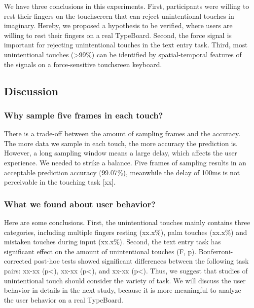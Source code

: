 We have three conclusions in this experiments. First, participants were willing to rest their fingers on the touchscreen that can reject unintentional touches in imaginary. Hereby, we proposed a hypothesis to be verified, where users are willing to rest their fingers on a real TypeBoard. Second, the force signal is important for rejecting unintentional touches in the text entry task. Third, most unintentional touches (>99\%) can be identified by spatial-temporal features of the signals on a force-sensitive touchsreen keyboard.


\subsection{Discussion}

\subsubsection{Why sample five frames in each touch?} There is a trade-off between the amount of sampling frames and the accuracy. The more data we sample in each touch, the more accuracy the prediction is. However, a long sampling window means a large delay, which affects the user experience. We needed to strike a balance. Five frames of sampling results in an acceptable prediction accuracy (99.07\%), meanwhile the delay of 100ms is not perceivable in the touching task [xx].


\subsubsection{What we found about user behavior?} Here are some conclusions. First, the unintentional touches mainly contains three categories, including multiple fingers resting (xx.x\%), palm touches (xx.x\%) and mistaken touches during input (xx.x\%). Second, the text entry task has significant effect on the amount of unintentional touches (F, p). Bonferroni-corrected post-hoc tests showed significant differences between the following task pairs: xx-xx (p<), xx-xx (p<), and xx-xx (p<). Thus, we suggest that studies of unintentional touch should consider the variety of task. We will discuss the user behavior in details in the next study, because it is more meaningful to analyze the user behavior on a real TypeBoard.

